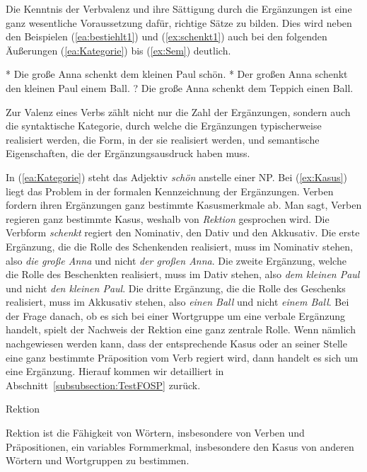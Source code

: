 Die Kenntnis der Verbvalenz und ihre Sättigung durch die Ergänzungen ist eine ganz wesentliche Voraussetzung dafür, richtige Sätze zu bilden. Dies wird neben den Beispielen (\ref{ea:bestiehlt1}) und (\ref{ex:schenkt1}) auch bei den folgenden Äußerungen (\ref{ea:Kategorie}) bis (\ref{ex:Sem}) deutlich.

\ea 
\ea \label{ea:Kategorie} * Die große Anna schenkt dem kleinen Paul schön.
\ex \label{ex:Kasus} * Der großen Anna schenkt den kleinen Paul einem Ball.
\ex \label{ex:Sem} ? Die große Anna schenkt dem Teppich einen Ball.
\z  
\z 

Zur Valenz eines Verbs zählt nicht nur die Zahl der Ergänzungen, sondern auch die syntaktische Kategorie, durch welche die Ergänzungen typischerweise realisiert werden, die Form, in der sie realisiert werden, und semantische Eigenschaften, die der Ergänzungsausdruck haben muss. 

In (\ref{ea:Kategorie}) steht das Adjektiv \textit{schön} anstelle einer NP. Bei (\ref{ex:Kasus}) liegt das Problem in der formalen Kennzeichnung der Ergänzungen. Verben fordern ihren Ergänzungen ganz bestimmte Kasusmerkmale ab. Man sagt, Verben regieren ganz bestimmte Kasus, weshalb von \textit{Rektion} gesprochen wird. Die Verbform \textit{schenkt} regiert den Nominativ, den Dativ und den Akkusativ. Die erste Ergänzung, die die Rolle des Schenkenden realisiert, muss im Nominativ stehen, also \textit{die große Anna} und nicht \textit{der großen Anna}. Die zweite Ergänzung, welche die Rolle des Beschenkten realisiert, muss im Dativ stehen, also \textit{dem kleinen Paul} und nicht \textit{den kleinen Paul}. Die dritte Ergänzung, die die Rolle des Geschenks realisiert, muss im Akkusativ stehen, also \textit{einen Ball} und nicht \textit{einem Ball}. Bei der Frage danach, ob es sich bei einer Wortgruppe um eine verbale Ergänzung handelt, spielt der Nachweis der Rektion eine ganz zentrale Rolle. Wenn nämlich nachgewiesen werden kann, dass der entsprechende Kasus oder an seiner Stelle eine ganz bestimmte Präposition vom Verb regiert wird, dann handelt es sich um eine Ergänzung. Hierauf kommen wir detailliert in Abschnitt~\ref{subsubsection:TestFOSP} zurück. 

\begin{Definition}{Rektion}
    
\noindent 
Rektion ist die Fähigkeit von Wörtern, insbesondere von Verben und Präpositionen, ein variables Formmerkmal, insbesondere den Kasus von anderen Wörtern und Wortgruppen zu bestimmen. 
\end{Definition}




